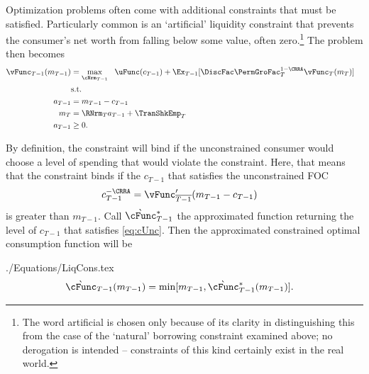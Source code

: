 \documentclass[titlepage, headings=optiontotocandhead]{\econtex}
\begin{document}
Optimization problems often come with additional constraints that must
be satisfied.  Particularly common is an `artificial' liquidity constraint that
prevents the consumer's net worth from falling below some value, often
zero.\footnote{The word artificial is chosen only because of its clarity in distinguishing
  this from the case of the `natural' borrowing constraint examined above; no derogation is
  intended -- constraints of this kind certainly exist in the real world.}  The problem then becomes
\begin{equation*}\begin{gathered}\begin{aligned}
      {\vFunc}_{T-1}({m}_{T-1})  & = \max_{\cNrm_{T-1}} ~~ \uFunc({c}_{T-1}) + \Ex_{T-1} [\DiscFac \PermGroFac_{T}^{1-\CRRA}{\vFunc}_{T}({m}_{T})] \label{eq:ConstrArt}
      \\ & \mbox{s.t.}&  \nonumber
      \\ {a}_{T-1}  & = {m}_{T-1} - {c}_{T-1}
      \\ {m}_{T}  & = \RNrm_{T} {a}_{T-1} + \TranShkEmp_{T}
      \\ {a}_{T-1} & \geq 0 .
    \end{aligned}\end{gathered}\end{equation*}


By definition, the constraint will bind if the unconstrained consumer
would choose a level of spending that would violate the constraint.
Here, that means that the constraint binds if the ${c}_{T-1}$
that satisfies the unconstrained FOC
\begin{equation}\begin{gathered}\begin{aligned}
      {c}_{T-1}^{-\CRRA}  & = \vFunc^{\prime}_{\overline{T-1}}({m}_{T-1}-{c}_{T-1}) \label{eq:cUnc}
    \end{aligned}\end{gathered}\end{equation}
is greater than ${m}_{T-1}$.  Call $\grave{\cFunc}^{\ast}_{T-1}$ the approximated function
returning the level of ${c}_{T-1}$ that satisfies \eqref{eq:cUnc}.
Then the approximated constrained optimal consumption function will be
\begin{verbatimwrite}{./Equations/LiqCons.tex}
  \begin{equation}\begin{gathered}\begin{aligned}
        \grave{\cFunc}_{T-1}({m}_{T-1})  & = \min[{m}_{T-1},\grave{\cFunc}^{\ast}_{T-1}({m}_{T-1})] \label{eq:LiqCons}.
      \end{aligned}\end{gathered}\end{equation}
\end{verbatimwrite}
\unskip
\end{document}

